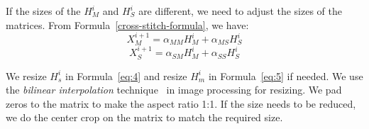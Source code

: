 


If the sizes of the $H_M^{i}$ and $H_S^{i}$ are different, we need to adjust the sizes of the matrices. From Formula~\ref{cross-stitch-formula}, we have:
\begin{equation}\label{eq:4}
	X_M^{i+1} = \alpha_{MM}H_M^{i} + \alpha_{MS}H_S^{i}
\end{equation}
\begin{equation}\label{eq:5}
  X_S^{i+1} = \alpha_{SM}H_M^{i} + \alpha_{SS}H_S^{i}
\end{equation}


We resize $H_s^{i}$ in Formula~\ref{eq:4} and resize $H_m^{i}$ in
Formula~\ref{eq:5} if needed. We use the {\em bilinear interpolation}
technique~\cite{bilinear-interpolation} in image processing for
resizing. We pad zeros to the matrix to make the aspect ratio 1:1. If
the size needs to be reduced, we do the center crop on the matrix to
match the required size.

